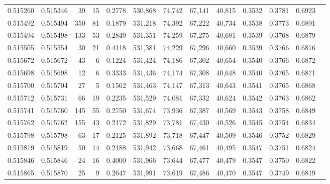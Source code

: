 \begin{tabular}{rrrrrrrrrrrrr}
0.515260 & 0.515346 &    39 &    15 &                                     0.2778 & 530,868 &  74,742 &  67,141 &  40,815 & 0.3532 & 0.3781 & 0.6923 \\
0.515492 & 0.515494 &   350 &    81 &                                     0.1879 & 531,218 &  74,392 &  67,222 &  40,734 & 0.3538 & 0.3773 & 0.6891 \\
0.515494 & 0.515498 &   133 &    53 &                                     0.2849 & 531,351 &  74,259 &  67,275 &  40,681 & 0.3539 & 0.3768 & 0.6879 \\
0.515505 & 0.515554 &    30 &    21 &                                     0.4118 & 531,381 &  74,229 &  67,296 &  40,660 & 0.3539 & 0.3766 & 0.6876 \\
0.515672 & 0.515672 &    43 &     6 &                                     0.1224 & 531,424 &  74,186 &  67,302 &  40,654 & 0.3540 & 0.3766 & 0.6872 \\
0.515698 & 0.515698 &    12 &     6 &                                     0.3333 & 531,436 &  74,174 &  67,308 &  40,648 & 0.3540 & 0.3765 & 0.6871 \\
0.515700 & 0.515704 &    27 &     5 &                                     0.1562 & 531,463 &  74,147 &  67,313 &  40,643 & 0.3541 & 0.3765 & 0.6868 \\
0.515712 & 0.515731 &    66 &    19 &                                     0.2235 & 531,529 &  74,081 &  67,332 &  40,624 & 0.3542 & 0.3763 & 0.6862 \\
0.515741 & 0.515760 &   145 &    55 &                                     0.2750 & 531,674 &  73,936 &  67,387 &  40,569 & 0.3543 & 0.3758 & 0.6849 \\
0.515762 & 0.515762 &   155 &    43 &                                     0.2172 & 531,829 &  73,781 &  67,430 &  40,526 & 0.3545 & 0.3754 & 0.6834 \\
0.515798 & 0.515798 &    63 &    17 &                                     0.2125 & 531,892 &  73,718 &  67,447 &  40,509 & 0.3546 & 0.3752 & 0.6829 \\
0.515819 & 0.515819 &    50 &    14 &                                     0.2188 & 531,942 &  73,668 &  67,461 &  40,495 & 0.3547 & 0.3751 & 0.6824 \\
0.515846 & 0.515846 &    24 &    16 &                                     0.4000 & 531,966 &  73,644 &  67,477 &  40,479 & 0.3547 & 0.3750 & 0.6822 \\
0.515865 & 0.515870 &    25 &     9 &                                     0.2647 & 531,991 &  73,619 &  67,486 &  40,470 & 0.3547 & 0.3749 & 0.6819 \\

\end{tabular}
